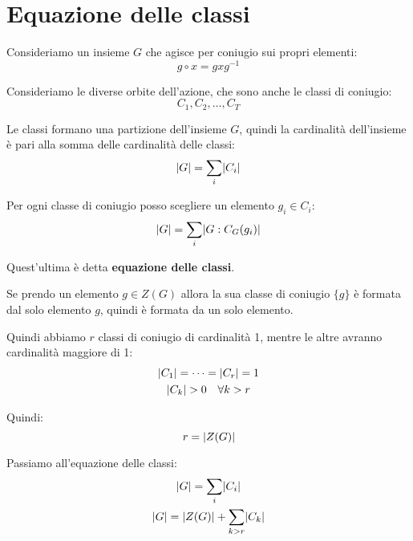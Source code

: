 \chapter{Equazione delle classi}
\label{ch:equazione_delle_classi}

Consideriamo un insieme $G$ che agisce per coniugio sui propri elementi:
\begin{equation*}
	g \circ x = gxg^{-1}
\end{equation*}

Consideriamo le diverse orbite dell'azione, che sono anche le classi di coniugio:
\begin{equation*}
	C_1, C_2, \dots, C_T
\end{equation*}

Le classi formano una partizione dell'insieme $G$, quindi la cardinalità dell'insieme è pari alla somma delle cardinalità delle classi:
\begin{equation*}
	\lvert G \rvert = \sum_i \lvert C_i \rvert
\end{equation*}

Per ogni classe di coniugio posso scegliere un elemento $g_i \in C_i$:
\begin{equation*}
	\lvert G \rvert = \sum_i \lvert G:C_G(g_i) \rvert
\end{equation*}

Quest'ultima è detta \textbf{equazione delle classi}.

Se prendo un elemento $g \in Z(G)$ allora la sua classe di coniugio $\{g\}$ è formata dal solo elemento $g$, quindi è formata da un solo elemento.

Quindi abbiamo $r$ classi di coniugio di cardinalità 1, mentre le altre avranno cardinalità maggiore di 1:
\begin{gather*}
	\lvert C_1 \rvert = \dots = \lvert C_r \rvert = 1 \\
	\lvert C_k \rvert > 0 \quad \forall k > r
\end{gather*}

Quindi:
\begin{equation*}
	r = \lvert Z(G) \rvert
\end{equation*}

Passiamo all'equazione delle classi:
\begin{gather}
	\lvert G \rvert = \sum_i \lvert C_i \rvert \notag \\
	\label{eq:equazione_delle_classi} \lvert G \rvert = \lvert Z(G) \rvert + \sum_{k> r}\lvert C_k \rvert
\end{gather}

